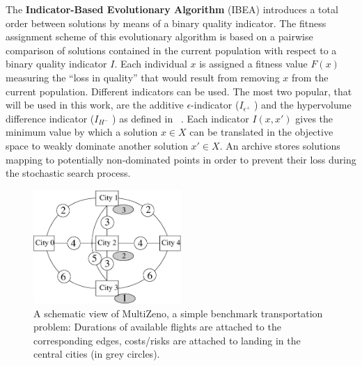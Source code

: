 \documentclass{llncs}
\def\MULTIZENO{{\sc MultiZeno}}
\begin{document}
The {\bf Indicator-Based Evolutionary Algorithm} (IBEA) \cite{Zitzler2004}
introduces a total order between solutions by means of a binary quality indicator. 
The fitness assignment scheme of this evolutionary algorithm is based on a pairwise comparison of solutions contained 
in  the current population with respect to a binary quality indicator $I$. Each individual $x$ is assigned a fitness value $F (x)$ measuring the ``loss in quality'' that would result from removing $x$ from the current
population. Different indicators can be used. The most two popular, that will be used in this work, are the additive $\epsilon$-indicator ($I_{\epsilon^+}$ ) and the hypervolume
difference indicator ($I_{H^-}$ )  as defined in ~\cite{Zitzler2004}. 
Each indicator  $I (x, x')$ gives the minimum value by which a solution $x \in X$  can be translated in the objective space to weakly dominate
another solution $x' \in X$. 
An archive stores solutions mapping to potentially non-dominated points in order to prevent their loss during the stochastic search process.



\begin{figure}[tb]
\begin{center}
 \includegraphics[width=0.5\textwidth]{./miniMulti.eps}
\caption{A schematic view of \MULTIZENO, a simple benchmark transportation problem: Durations of available flights are attached to the corresponding edges, costs/risks are attached to landing in the central cities (in grey circles).}
\label{fig.instance}
\end{center}
\end{figure}
\end{document}
